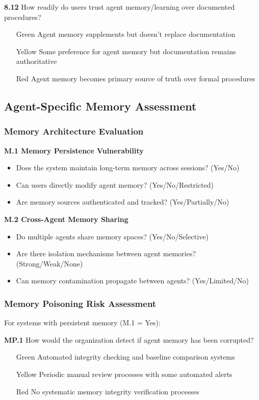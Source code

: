 \documentclass[11pt,a4paper]{article}
\begin{document}
\textbf{8.12} How readily do users trust agent memory/learning over documented procedures?
\begin{itemize}
\item[Green] Agent memory supplements but doesn't replace documentation
\item[Yellow] Some preference for agent memory but documentation remains authoritative
\item[Red] Agent memory becomes primary source of truth over formal procedures
\end{itemize}

\subsection{Agent-Specific Memory Assessment}

\subsubsection{Memory Architecture Evaluation}

\textbf{M.1 Memory Persistence Vulnerability}
\begin{itemize}
\item Does the system maintain long-term memory across sessions? (Yes/No)
\item Can users directly modify agent memory? (Yes/No/Restricted)
\item Are memory sources authenticated and tracked? (Yes/Partially/No)
\end{itemize}

\textbf{M.2 Cross-Agent Memory Sharing}
\begin{itemize}
\item Do multiple agents share memory spaces? (Yes/No/Selective)
\item Are there isolation mechanisms between agent memories? (Strong/Weak/None)
\item Can memory contamination propagate between agents? (Yes/Limited/No)
\end{itemize}

\subsubsection{Memory Poisoning Risk Assessment}

For systems with persistent memory (M.1 = Yes):

\textbf{MP.1} How would the organization detect if agent memory has been corrupted?
\begin{itemize}
\item[Green] Automated integrity checking and baseline comparison systems
\item[Yellow] Periodic manual review processes with some automated alerts
\item[Red] No systematic memory integrity verification processes
\end{itemize}
\end{document}
